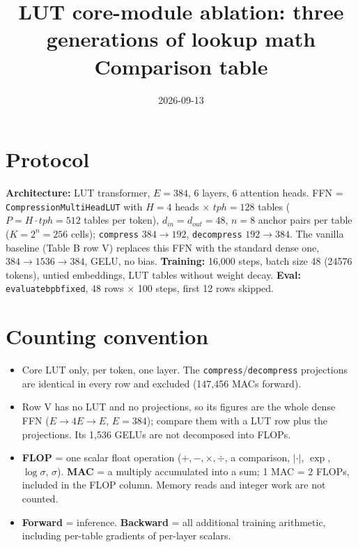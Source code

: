 \documentclass[10pt]{article}
\title{LUT core-module ablation: three generations of lookup math\\[2pt]
\large Comparison table}
\date{2026-09-13}
\author{}
\newcommand{\code}[1]{{\renewcommand{\_}{\textunderscore\allowbreak}\texttt{#1}}}
\begin{document}
\maketitle
\vspace{-2.5em}

\section*{Protocol}
\textbf{Architecture:} LUT transformer, $E=384$, 6 layers, 6 attention heads. FFN = \code{CompressionMultiHeadLUT} with $H=4$ heads $\times$ $tph=128$ tables
($P=H\cdot tph=512$ tables per token), $d_{in}=d_{out}=48$, $n=8$ anchor pairs per table ($K=2^n=256$ cells); \code{compress} $384\to192$, \code{decompress} $192\to384$.
The vanilla baseline (Table B row V) replaces this FFN with the standard dense one, $384\to1536\to384$, GELU, no bias.
\textbf{Training:} 16{,}000 steps, batch size 48 (24576 tokens), untied embeddings, LUT tables without weight decay.
\textbf{Eval:} \code{evaluate\_bpb\_fixed}, 48 rows $\times$ 100 steps, first 12 rows skipped.


\section*{Counting convention}
\begin{itemize}\setlength\itemsep{0pt}
\item Core LUT only, per token, one layer. The \code{compress}/\code{decompress} projections are identical in every row and excluded (147,456 MACs forward).
\item Row V has no LUT and no projections, so its figures are the whole dense FFN ($E\to4E\to E$, $E=384$); compare them with a LUT row plus the projections. Its 1,536 GELUs are not decomposed into FLOPs.
\item \textbf{FLOP} = one scalar float operation ($+,-,\times,\div$, a comparison, $|\cdot|$, $\exp$, $\log\sigma$, $\sigma$). \textbf{MAC} = a multiply accumulated into a sum; 1 MAC = 2 FLOPs,
  included in the FLOP column. Memory reads and integer work are not counted.
\item \textbf{Forward} = inference. \textbf{Backward} = all additional training arithmetic, including per-table gradients of per-layer scalars.
\end{itemize}

\newpage
\end{document}
